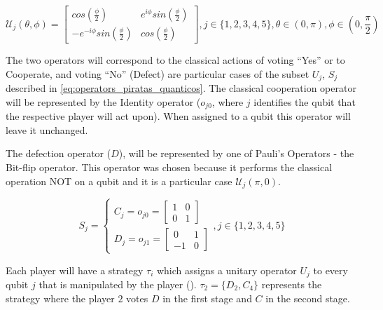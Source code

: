 \begin{equation}
\mathcal{U}_{j}(\theta,\phi) = \left[\begin{array}{cc}
cos(\frac{\phi}{2}) & e^{i\phi}sin(\frac{\phi}{2})\\
-e^{-i\phi}sin(\frac{\phi}{2}) & cos(\frac{\phi}{2})
\end{array}\right] , j \in \{ 1, 2, 3, 4, 5 \}, \theta \in ( 0, \pi ) , \phi \in ( 0, \frac{\pi}{2})
\label{eq:operadoresinfinitus}
\end{equation}


 The two operators will correspond to the classical actions of voting ``Yes'' or to Cooperate, and voting ``No'' (Defect) are particular cases of the subset $U_{j}$, $S_{j}$ described in \ref{eq:operators_piratas_quanticos}.  
The classical cooperation operator will be represented by the Identity operator ($o_{j0}$, where $j$ identifies the qubit that the respective player will act upon). When assigned to a qubit this operator will leave it unchanged. 

The defection operator ($D$), will be represented by one of Pauli's Operators - the Bit-flip operator. This operator was chosen because it performs the classical operation NOT on a qubit and it is a particular case $\mathcal{U}_{j}(\pi, 0)$.


\begin{equation}
S_{j} = \begin{cases}
C_{j} = o_{j0}=\left[\begin{array}{cc}
1 & 0\\
0 & 1
\end{array}\right]\\
D_{j} = o_{j1}=\left[\begin{array}{cc}
0 & 1\\
-1 & 0
\end{array}\right]
\end{cases} , j \in \{ 1, 2, 3, 4, 5 \}
\label{eq:operators_piratas_quanticos}
\end{equation}

Each player will have a strategy $\tau_{i}$  which assigns a
unitary operator $U_{j}$ to every qubit $j$ that is manipulated
by the player (). $\tau_{2}= \{D_{2},C_{4}\}$ represents the strategy where the player $2$ votes $D$ in the first stage and $C$ in the second stage.


